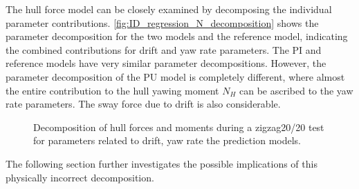 The hull force model can be closely examined by decomposing the individual parameter contributions. \autoref{fig:ID_regression_N_decomposition} shows the parameter decomposition for the two models and the reference model, indicating the combined contributions for drift and yaw rate parameters. The PI  and reference models have very similar parameter decompositions.
However, the parameter decomposition of the PU model is completely different, where almost the entire contribution to the hull yawing moment $N_H$ can be ascribed to the yaw rate parameters. The sway force due to drift is also considerable.  
\begin{figure}[h]
    \begin{center}
        
        \caption{Decomposition of hull forces and moments during a zigzag20/20 test for parameters related to drift, yaw rate the prediction models.}
        \label{fig:ID_regression_N_decomposition}
    \end{center}
\end{figure}
The following section further investigates the possible implications of this physically incorrect decomposition.